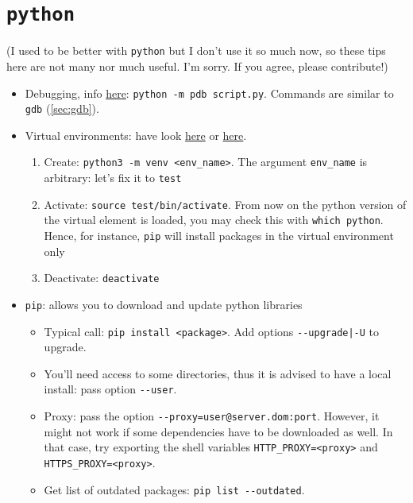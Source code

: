 \documentclass[a4paper,12pt,%
              final%
              ]{article}
\begin{document}
\section{\texttt{python}}
\label{sec:python}
(I used to be better with \texttt{python} but I don't use it so much now, so these tips here are not many nor much useful. I'm sorry. If you agree, please contribute!)
\begin{itemize}
  \item Debugging, info \href{https://docs.python.org/2/library/pdb.html}{here}: \texttt{python -m pdb script.py}. Commands are similar to \texttt{gdb} (\ref{sec:gdb}).
  \item Virtual environments: have look \href{https://packaging.python.org/guides/installing-using-pip-and-virtual-environments/}{here} or \href{https://docs.python.org/3/tutorial/venv.html}{here}.
    \begin{enumerate}
      \item Create: \verb|python3 -m venv <env_name>|. The argument \verb|env_name| is arbitrary: let's fix it to \verb|test|
      \item Activate: \verb|source test/bin/activate|. From now on the python version of the virtual element is loaded, you may check this with \verb|which python|. Hence, for instance, \verb|pip| will install packages in the virtual environment only
      \item Deactivate: \verb|deactivate|
    \end{enumerate}
  \item \texttt{pip}: allows you to download and update python libraries
    \begin{itemize}
      \item Typical call: \verb|pip install <package>|. Add options \verb!--upgrade|-U! to upgrade.
      \item You'll need access to some directories, thus it is advised to have a local install: pass option \verb|--user|.
      \item Proxy: pass the option \verb|--proxy=user@server.dom:port|. However, it might not work if some dependencies have to be downloaded as well. In that case, try exporting the shell variables \verb|HTTP_PROXY=<proxy>| and \verb|HTTPS_PROXY=<proxy>|.
      \item Get list of outdated packages: \verb|pip list --outdated|.

\end{itemize}
\end{itemize}
\end{document}
